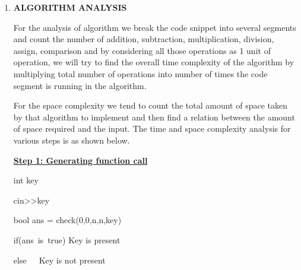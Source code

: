 \documentclass[14pt]{article}
\renewcommand{\_}{\kern-1.5pt\textunderscore\kern-1.5pt}
\begin{document}
\begin{multicols}{2}
\begin{enumerate}
\vspace{\baselineskip}

\vspace{\baselineskip}

\vspace{\baselineskip}

\vspace{\baselineskip}
	\item {\fontsize{15pt}{18.0pt}\selectfont \textbf{ALGORITHM ANALYSIS}}

\vspace{\baselineskip}
\begin{justify}
For the analysis of algorithm we break the code snippet into several segments and count the number of addition, subtraction, multiplication, division, assign, comparison and by considering all those operations as 1 unit of operation, we will try to find the overall time complexity of the algorithm by multiplying total number of operations into number of times the code segment is running in the algorithm.
\end{justify}
\begin{justify}
For the space complexity we tend to count the total amount of space taken by that algorithm to implement and then find a relation between the amount of space required and the input. The time and space complexity analysis for various steps is as shown below.
\end{justify}

\vspace{\baselineskip}
\vspace{\baselineskip}
\begin{justify}
\textbf{\uline{Step 1: Generating function call}} 
\end{justify}

\vspace{\baselineskip}
\begin{justify}
int key
\end{justify}
\begin{justify}
cin>>key
\end{justify}
\begin{justify}
bool ans = check(0,0,n,n,key)
\end{justify}
\begin{justify}
if(ans\ is\ true)   Key is present
\end{justify}
\begin{justify}
else\ \ \  Key is not present
\end{justify}


\end{enumerate}
\end{multicols}
\end{document}
